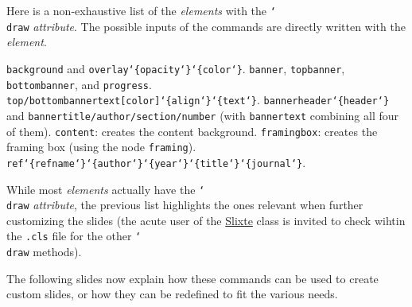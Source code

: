 \documentclass{slixte}
\def\clsurl{https://ctan.org/pkg/slixte}
\newcommand{\codetext}[1]{\texttt{\color{second}#1}}
\newcommand{\cmdt}[1]{\char`\\#1}
\newcommand{\cbrl}{\char`\{}
\newcommand{\cbrr}{\char`\}}
\newcommand{\cbrt}[1]{\cbrl#1\cbrr}
\newcommand{\sptm}[1]{\textit{\color{third}#1}}
\newcommand{\slixte}{\href{\clsurl}{\color{first}Slixte}}
\begin{document}
\begin{slide}
    Here is a non-exhaustive list of the \sptm{elements} with the \codetext{\cmdt{draw}} \sptm{attribute}.
    The possible inputs of the commands are directly written with the \sptm{element}.
    \begin{itemize}
        \fillitem \codetext{background} and \codetext{overlay\cbrt{opacity}\cbrt{color}}.
        \fillitem \codetext{banner}, \codetext{topbanner}, \codetext{bottombanner}, and \codetext{progress}.
        \fillitem \codetext{top/bottombannertext[color]\cbrt{align}\cbrt{text}}.
        \fillitem \codetext{bannerheader\cbrt{header}} and \codetext{bannertitle/author/section/number} (with \codetext{bannertext} combining all four of them).
        \fillitem \codetext{content}: creates the content background.
        \fillitem \codetext{framingbox}: creates the framing box (using the node \codetext{framing}).
        \fillitem \codetext{ref\cbrt{refname}\cbrt{author}\cbrt{year}\cbrt{title}\cbrt{journal}}.
    \end{itemize}
\end{slide}

\begin{slide}
    While most \sptm{elements} actually have the \codetext{\cmdt{draw}} \sptm{attribute}, the previous list highlights the ones relevant when further customizing the slides (the acute user of the \slixte{} class is invited to check wihtin the \codetext{.cls} file for the other \codetext{\cmdt{draw}} methods).

    \spacing[1]

    The following slides now explain how these commands can be used to create custom slides, or how they can be redefined to fit the various needs.

    \spacing[1]

    \iftoggle{examples}{
    Before that, the code behind the \codetext{slide} environment is provided, hoping it helps clarify the use of some of these commands.
    }{}
\end{slide}
\end{document}

